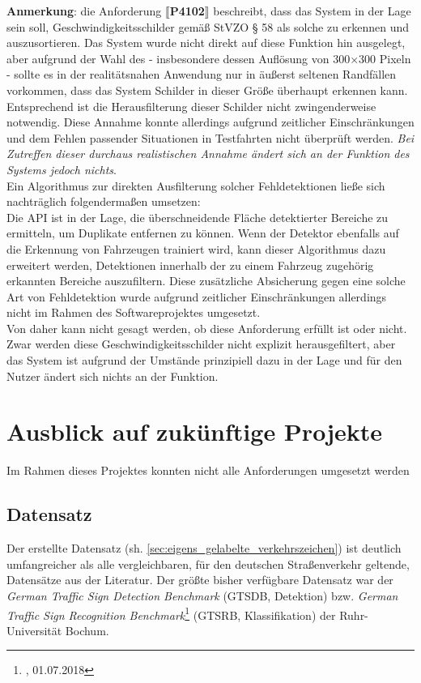 \documentclass[12pt,a4paper,ngerman,enabledeprecatedfontcommands]{scrreprt}
\begin{document}
\textbf{Anmerkung}: die Anforderung \textbf{$\llbracket$P4102$\rrbracket$} beschreibt, dass das \gls{System} in der Lage sein soll, Geschwindigkeitsschilder gemäß \gls{StVZO} § 58 als solche zu erkennen und auszusortieren. Das \gls{System} wurde nicht direkt auf diese Funktion hin ausgelegt, aber aufgrund der Wahl des  - insbesondere dessen Auflösung von 300$\times$300 Pixeln - sollte es in der realitätsnahen Anwendung nur in äußerst seltenen Randfällen vorkommen, dass das \gls{System} Schilder in dieser Größe überhaupt erkennen kann. Entsprechend ist die Herausfilterung dieser Schilder nicht zwingenderweise notwendig. Diese Annahme konnte allerdings aufgrund zeitlicher Einschränkungen und dem Fehlen passender Situationen in Testfahrten nicht überprüft werden. \emph{Bei Zutreffen dieser durchaus realistischen Annahme ändert sich an der Funktion des \gls{System}s jedoch nichts}.\\
Ein Algorithmus zur direkten Ausfilterung solcher Fehldetektionen ließe sich nachträglich folgendermaßen umsetzen:\\
Die API ist in der Lage, die überschneidende Fläche detektierter Bereiche zu ermitteln, um Duplikate entfernen zu können. Wenn der Detektor ebenfalls auf die Erkennung von Fahrzeugen trainiert wird, kann dieser Algorithmus dazu erweitert werden, Detektionen innerhalb der zu einem Fahrzeug zugehörig erkannten Bereiche auszufiltern. Diese zusätzliche Absicherung gegen eine solche Art von Fehldetektion wurde aufgrund zeitlicher Einschränkungen allerdings nicht im Rahmen des Softwareprojektes umgesetzt.\\
Von daher kann nicht gesagt werden, ob diese Anforderung erfüllt ist oder nicht. Zwar werden diese Geschwindigkeitsschilder nicht explizit herausgefiltert, aber das \gls{System} ist aufgrund der Umstände prinzipiell dazu in der Lage und für den \gls{Nutzer} ändert sich nichts an der Funktion.\\

\chapter{Ausblick auf zukünftige Projekte}

Im Rahmen dieses Projektes konnten nicht alle Anforderungen umgesetzt werden

\section{Datensatz}
Der erstellte Datensatz (sh. \cref{sec:eigens_gelabelte_verkehrszeichen}) ist deutlich umfangreicher als alle vergleichbaren, für den deutschen Straßenverkehr geltende, Datensätze aus der Literatur. Der größte bisher verfügbare Datensatz war der \textit{German Traffic Sign Detection Benchmark} (GTSDB, \gls{Detektion}) bzw. \textit{German Traffic Sign Recognition Benchmark}\footnote{, 01.07.2018} (GTSRB, \gls{Klassifikation}) der Ruhr-Universität Bochum.\\
\end{document}
